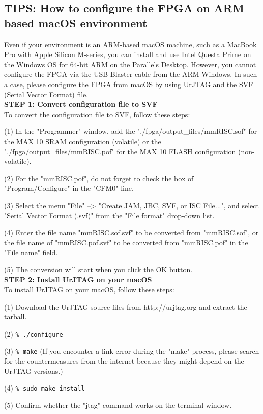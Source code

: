\subsection{TIPS: How to configure the FPGA on ARM based macOS environment}

Even if your environment is an ARM-based macOS machine, such as a MacBook Pro with Apple Silicon M-series, you can install and use Intel Questa Prime on the Windows OS for 64-bit ARM on the Parallels Desktop. However, you cannot configure the FPGA via the USB Blaster cable from the ARM Windows. In such a case, please configure the FPGA from macOS by using UrJTAG and the SVF (Serial Vector Format) file.\\

\textbf{STEP 1: Convert configuration file to SVF}\\
To convert the configuration file to SVF, follow these steps:

(1) In the "Programmer" window, add the "./fpga/output\_files/mmRISC.sof" for the MAX 10 SRAM configuration (volatile) or the "./fpga/output\_files/mmRISC.pof" for the MAX 10 FLASH configuration (non-volatile).

(2) For the "mmRISC.pof", do not forget to check the box of "Program/Configure" in the "CFM0" line.

(3) Select the menu "File" --> "Create JAM, JBC, SVF, or ISC File...", and select "Serial Vector Format (.svf)" from the "File format" drop-down list.

(4) Enter the file name "mmRISC.sof.svf" to be converted from "mmRISC.sof", or the file name of "mmRISC.pof.svf" to be converted from "mmRISC.pof" in the "File name" field.

(5) The conversion will start when you click the OK button.\\

\textbf{STEP 2: Install UrJTAG on your macOS}\\
To install UrJTAG on your macOS, follow these steps:

(1) Download the UrJTAG source files from http://urjtag.org and extract the tarball.

(2) \texttt{\% ./configure}

(3) \texttt{\% make} (If you encounter a link error during the "make" process, please search for the countermeasures from the internet because they might depend on the UrJTAG versions.)

(4) \texttt{\% sudo make install}

(5) Confirm whether the "jtag" command works on the terminal window.

